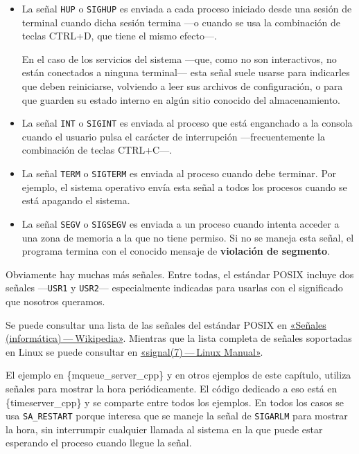 \begin{itemize}
\item
  La señal \texttt{HUP} o \texttt{SIGHUP} es enviada a cada proceso
  iniciado desde una sesión de terminal cuando dicha sesión termina ---o
  cuando se usa la combinación de teclas {CTRL+D}, que tiene el mismo
  efecto---.

  En el caso de los servicios del sistema ---que, como no son
  interactivos, no están conectados a ninguna terminal--- esta señal
  suele usarse para indicarles que deben reiniciarse, volviendo a leer
  sus archivos de configuración, o para que guarden su estado interno en
  algún sitio conocido del almacenamiento.
\item
  La señal \texttt{INT} o \texttt{SIGINT} es enviada al proceso que está
  enganchado a la consola cuando el usuario pulsa el carácter de
  interrupción ---frecuentemente la combinación de teclas {CTRL+C}---.
\item
  La señal \texttt{TERM} o \texttt{SIGTERM} es enviada al proceso cuando
  debe terminar. Por ejemplo, el sistema operativo envía esta señal a
  todos los procesos cuando se está apagando el sistema.
\item
  La señal \texttt{SEGV} o \texttt{SIGSEGV} es enviada a un proceso
  cuando intenta acceder a una zona de memoria a la que no tiene
  permiso. Si no se maneja esta señal, el programa termina con el
  conocido mensaje de \textbf{violación de segmento}.
\end{itemize}

Obviamente hay muchas más señales. Entre todas, el estándar POSIX
incluye dos señales ---\texttt{USR1} y \texttt{USR2}--- especialmente
indicadas para usarlas con el significado que nosotros queramos.

Se puede consultar una lista de las señales del estándar POSIX en
\href{https://es.wikipedia.org/wiki/Se\%C3\%B1al_(inform\%C3\%A1tica)}{«Señales
(informática) --- Wikipedia»}. Mientras que la lista completa de señales
soportadas en Linux se puede consultar en
\href{https://man7.org/linux/man-pages/man7/signal.7.html}{«signal(7) --- Linux
Manual»}.

El ejemplo en \{mqueue\_server\_cpp\} y en otros ejemplos de este
capítulo, utiliza señales para mostrar la hora periódicamente. El código
dedicado a eso está en \{timeserver\_cpp\} y se comparte entre todos los
ejemplos. En todos los casos se usa \texttt{SA\_RESTART} porque interesa
que se maneje la señal de \texttt{SIGARLM} para mostrar la hora, sin
interrumpir cualquier llamada al sistema en la que puede estar esperando
el proceso cuando llegue la señal.

